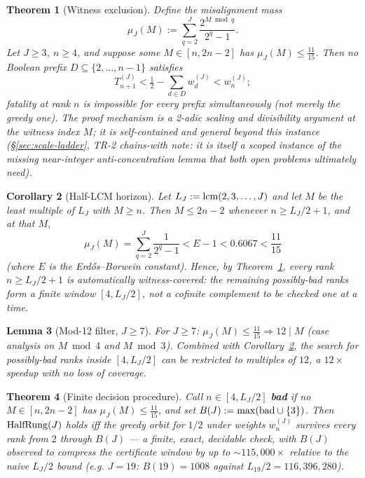 \documentclass[11pt]{article}
\theoremstyle{plain}
\newtheorem{thm}{Theorem}[section]
\newtheorem{lem}[thm]{Lemma}
\newtheorem{cor}[thm]{Corollary}
\theoremstyle{definition}
\theoremstyle{remark}
\let\origmathrm\mathrm
\renewcommand{\mathrm}[1]{\ifmmode\origmathrm{#1}\else\textrm{#1}\fi}%
\begin{document}
\begin{thm}[Witness exclusion]
\label{thm:tr-witness-exclusion}
Define the misalignment mass
$$\mu_J(M):=\sum_{q=2}^{J}\frac{2^{M\bmod q}}{2^q-1}.$$
Let $J\ge3$, $n\ge4$, and suppose some $M\in[n,2n-2]$ has $\mu_J(M)\le\tfrac{11}{15}$. Then no
Boolean prefix $D\subseteq\{2,\ldots,n-1\}$ satisfies
$$T_{n+1}^{(J)}<\tfrac12-\sum_{d\in D}w_d^{(J)}<w_n^{(J)};$$
fatality at rank $n$ is impossible for every prefix simultaneously (not merely the greedy one).
The proof mechanism is a 2-adic scaling and divisibility argument at the witness index $M$; it is
self-contained and general beyond this instance (\S\ref{sec:scale-ladder}, TR-2 chains-with note:
it is itself a scoped instance of the missing near-integer anti-concentration lemma that both open
problems ultimately need).
\end{thm}

\begin{cor}[Half-LCM horizon]
\label{cor:tr-half-lcm}
Let $L_J:=\mathrm{lcm}(2,3,\ldots,J)$ and let $M$ be the least multiple of $L_J$ with $M\ge n$.
Then $M\le2n-2$ whenever $n\ge L_J/2+1$, and at that $M$,
$$\mu_J(M)=\sum_{q=2}^{J}\frac{1}{2^q-1}<E-1<0.6067<\frac{11}{15}$$
(where $E$ is the Erdős--Borwein constant). Hence, by Theorem~\ref{thm:tr-witness-exclusion}, every
rank $n\ge L_J/2+1$ is automatically witness-covered: the remaining possibly-bad ranks form a
finite window $[4,L_J/2]$, not a cofinite complement to be checked one at a time.
\end{cor}

\begin{lem}[Mod-12 filter, $J\ge7$]
\label{lem:tr-mod12}
For $J\ge7$: $\mu_J(M)\le\tfrac{11}{15}\Rightarrow 12\mid M$ (case analysis on $M\bmod4$ and
$M\bmod3$). Combined with Corollary~\ref{cor:tr-half-lcm}, the search for possibly-bad ranks inside
$[4,L_J/2]$ can be restricted to multiples of $12$, a $12\times$ speedup with no loss of coverage.
\end{lem}

\begin{thm}[Finite decision procedure]
\label{thm:tr-finite-decision}
Call $n\in[4,L_J/2]$ \textbf{bad} if no $M\in[n,2n-2]$ has $\mu_J(M)\le\tfrac{11}{15}$, and set
$B(J):=\max(\mathrm{bad}\cup\{3\})$. Then $\mathrm{HalfRung}(J)$ holds iff the greedy orbit for
$1/2$ under weights $w_n^{(J)}$ survives every rank from $2$ through $B(J)$ — a finite, exact,
decidable check, with $B(J)$ observed to compress the certificate window by up to $\sim115{,}000\times$
relative to the naive $L_J/2$ bound (\emph{e.g.} $J=19$: $B(19)=1008$ against $L_{19}/2=116{,}396{,}280$).
\end{thm}
\end{document}

